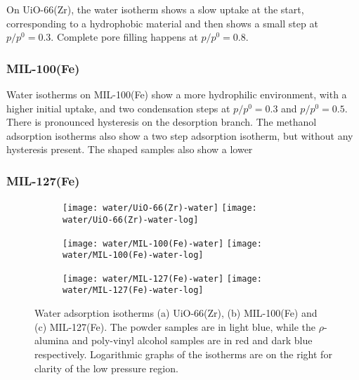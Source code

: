 On UiO-66(Zr), the water isotherm shows a slow uptake at the 
start, corresponding to a hydrophobic material and then shows 
a small step at \(p/p^0 = 0.3\). Complete pore filling happens 
at \(p/p^0 = 0.8\).

\subsubsection{MIL-100(Fe)}

Water isotherms on MIL-100(Fe) show a more hydrophilic environment,
with a higher initial uptake, and two condensation steps at 
\(p/p^0 = 0.3\) and \(p/p^0 = 0.5\). There is pronounced 
hysteresis on the desorption branch.
The methanol adsorption isotherms also show a two step adsorption
isotherm, but without any hysteresis present. The shaped samples 
also show a lower 

\subsubsection{MIL-127(Fe)}

\begin{figure}[p!]
    \centering

    \begin{subfigure}{\linewidth}
        \centering
        \parbox{0.1\linewidth}{\caption{}\label{shaping:fgr:wateruio66}}%
        \texttt{[image: water/UiO-66(Zr)-water]}%
        \texttt{[image: water/UiO-66(Zr)-water-log]}%
    \end{subfigure}

    \begin{subfigure}{\linewidth}
        \centering
        \parbox{0.1\linewidth}{\caption{}\label{shaping:fgr:watermil100}}%
        \texttt{[image: water/MIL-100(Fe)-water]}%
        \texttt{[image: water/MIL-100(Fe)-water-log]}%
    \end{subfigure}

    \begin{subfigure}{\linewidth}
        \centering
        \parbox{0.1\linewidth}{\caption{}\label{shaping:fgr:watermil127}}%
        \texttt{[image: water/MIL-127(Fe)-water]}%
        \texttt{[image: water/MIL-127(Fe)-water-log]}%
    \end{subfigure}
    
    \caption{Water adsorption isotherms (a) UiO-66(Zr), 
    (b) MIL-100(Fe) and (c) MIL-127(Fe). The powder samples are in light
    blue, while the \(\rho\)-alumina and poly-vinyl alcohol samples are in red
    and dark blue respectively. Logarithmic graphs of the isotherms are
    on the right for clarity of the low
    pressure region.}%
    \label{shaping:fgr:wateradsorption}
\end{figure}


